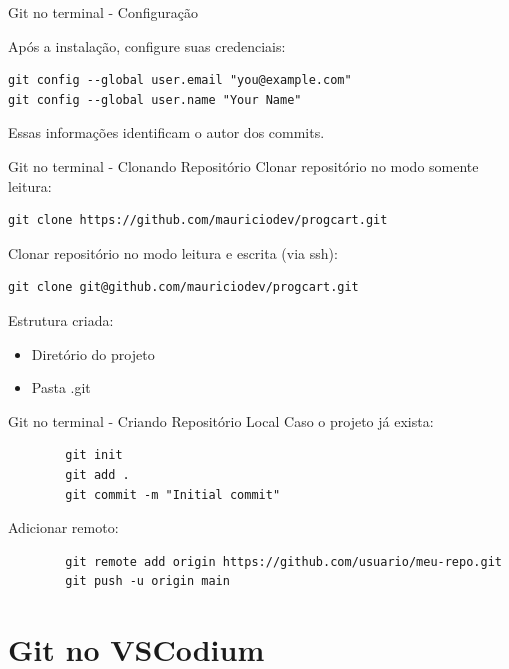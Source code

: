 \documentclass{beamer}
\begin{document}
\begin{frame}[fragile]{Git no terminal - Configuração}
    
    Após a instalação, configure suas credenciais:
    
    \begin{verbatim}
git config --global user.email "you@example.com"
git config --global user.name "Your Name"
    \end{verbatim}
    
    Essas informações identificam o autor dos commits.
    
\end{frame}

\begin{frame}[fragile]{Git no terminal - Clonando Repositório}
    Clonar repositório no modo somente leitura:
    \begin{verbatim}
git clone https://github.com/mauriciodev/progcart.git
    \end{verbatim}
        \vspace{0.3cm}
    Clonar repositório no modo leitura e escrita (via ssh):
    \begin{verbatim}
git clone git@github.com/mauriciodev/progcart.git
    \end{verbatim}
        \vspace{0.3cm}
    Estrutura criada:
    \begin{itemize}
        \item Diretório do projeto
        \item Pasta .git
    \end{itemize}
\end{frame}

\begin{frame}[fragile]{Git no terminal - Criando Repositório Local}
    Caso o projeto já exista:
    
    \begin{verbatim}
        git init
        git add .
        git commit -m "Initial commit"
    \end{verbatim}
    
    Adicionar remoto:
    
    \begin{verbatim}
        git remote add origin https://github.com/usuario/meu-repo.git
        git push -u origin main
    \end{verbatim}
\end{frame}

\section{Git no VSCodium}
\end{document}
